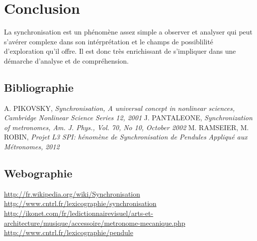 \documentclass[a4paper,11pt]{report}
\begin{document}
\chapter*{Conclusion}
La synchronisation est un phénomène assez simple a observer et analyser qui peut s'avérer complexe dans son intérprétation et le champs de possiblilité d'exploration qu'il offre. Il est donc très enrichissant de s'impliquer dans une démarche d'analyse et de compréhension.
\renewcommand{\bibname}{Références}
\begin{thebibliography}{2}
\section*{Bibliographie}
 A. PIKOVSKY, {\it Synchronisation, A universal concept in nonlinear sciences, Cambridge Nonlinear Science Series 12, 2001}
 J. PANTALEONE, {\it Synchronization of metronomes, Am. J. Phys., Vol. 70, No 10, October 2002}
 M. RAMSEIER, M. ROBIN, {\it Projet L3 SPI: hénomène de Synchronisation de Pendules Appliqué aux Métronomes, 2012}
\section*{Webographie}
 \url{http://fr.wikipedia.org/wiki/Synchronisation}
 \url{http://www.cntrl.fr/lexicographie/synchronisation}
 \url{http://ikonet.com/fr/ledictionnairevisuel/arts-et-architecture/musique/accessoire/metronome-mecanique.php}
 \url{http://www.cntrl.fr/lexicographie/pendule}
\end{thebibliography}
\appendix
\end{document}
